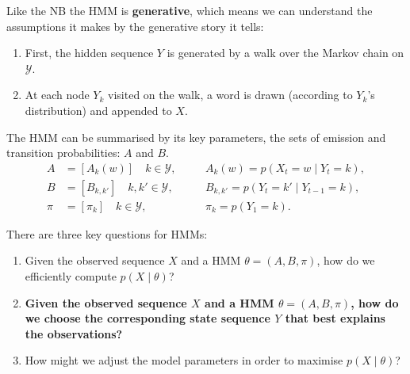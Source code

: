 \documentclass[envcountsect]{beamer}
\begin{document}
\begin{frame}

Like the NB the HMM is \textbf{generative}, which means we can understand the assumptions it makes by the generative story it tells:
\begin{enumerate}
    \item First, the hidden sequence $Y$ is generated by a walk over the Markov chain on $\mathcal{Y}$.
    \item At each node $Y_k$ visited on the walk, a word is drawn (according to $Y_k$'s distribution) and appended to $X$.
\end{enumerate}


The HMM can be summarised by its key parameters, the sets of emission and transition probabilities: $A$ and $B$.
\begin{align*}
    A &= [ A_k(w) ] \quad k \in \mathcal{Y}, & \quad & A_k(w) = p(X_t = w \mid Y_t = k), \\
    B  &= [ B_{k,k'} ] \quad k, k' \in \mathcal{Y}, & \quad  & B_{k,k'} = p(Y_t = k' \mid Y_{t-1} = k), \\
    \pi &= [ \pi_k ] \quad k \in \mathcal{Y}, & \quad & \pi_k = p(Y_1 = k).
\end{align*}

\end{frame}

\begin{frame}

There are three key questions for HMMs:
\begin{enumerate}
    \item Given the observed sequence $X$ and a HMM $\theta = (A, B, \pi)$, how do we efficiently compute $p(X \mid \theta)$?
    \item \textbf{Given the observed sequence $X$ and a HMM $\theta = (A, B, \pi)$, how do we choose the corresponding state sequence $Y$ that best explains the observations?}
    \item How might we adjust the model parameters in order to maximise $p(X \mid \theta)$?
\end{enumerate}

\end{frame}
\end{document}
